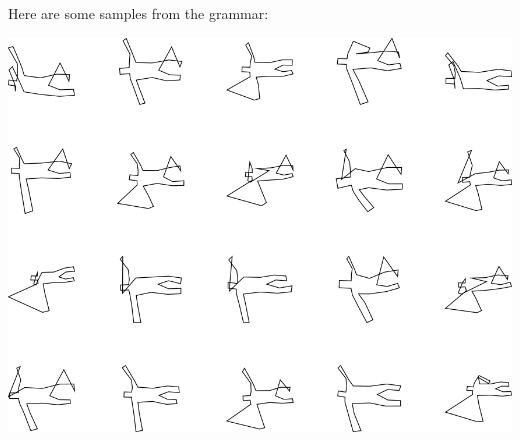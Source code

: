 Here are some samples from the grammar:

\includegraphics[width=6in]{output/3.learning/incremental/gram.14.d/samples.png}

